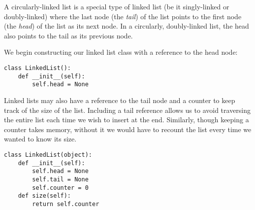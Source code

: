 \begin{center}
\end{center}
\begin{center}
\end{center}
A circularly-linked list is a special type of linked list (be it singly-linked or doubly-linked) where the last node (the \emph{tail}) of the list points to the first node (the \emph{head}) of the list as its next node.
In a circularly, doubly-linked list, the head also points to the tail as its previous node.

We begin constructing our linked list class with a reference to the head node:
\begin{lstlisting}
class LinkedList():
    def __init__(self):
        self.head = None
\end{lstlisting}

Linked lists may also have a reference to the tail node and a counter to keep track of the size of the list.
Including a tail reference allows us to avoid traversing the entire list each time we wish to insert at the end.
Similarly, though keeping a counter takes memory, without it we would have to recount the list every time we wanted to know its size.
\begin{lstlisting}
class LinkedList(object):
    def __init__(self):
        self.head = None
        self.tail = None
        self.counter = 0
    def size(self):
        return self.counter
\end{lstlisting}

